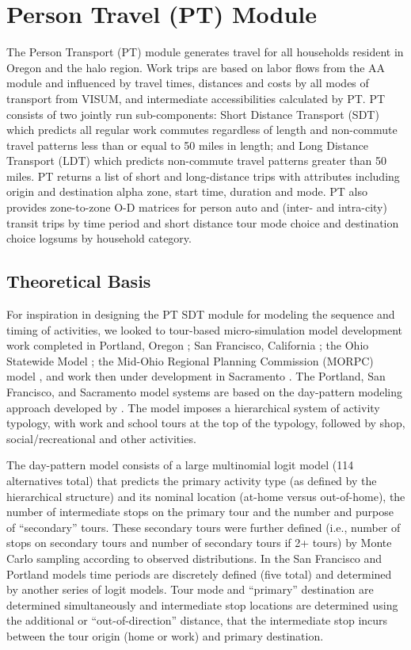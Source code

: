 \chapter{Person Travel (PT) Module}\label{sec:pt-module-chapter}
The Person Transport (PT) module generates travel for all households resident in Oregon and the halo region. Work trips are based on labor flows from the AA module and influenced by travel times, distances and costs by all modes of transport from VISUM, and intermediate accessibilities calculated by PT. PT consists of two jointly run sub-components: Short Distance Transport (SDT) which predicts all regular work commutes regardless of length and non-commute travel patterns less than or equal to 50 miles in length; and Long Distance Transport (LDT) which predicts non-commute travel patterns greater than 50 miles. PT returns a list of short and long-distance trips with attributes including origin and destination alpha zone, start time, duration and mode. PT also provides zone-to-zone O-D matrices for person auto and (inter- and intra-city) transit trips by time period and short distance tour mode choice and destination choice logsums by household category.

\section{Theoretical Basis}
For inspiration in designing the PT SDT module for modeling the sequence and timing of activities, we looked to tour-based micro-simulation model development work completed in Portland, Oregon \citep{cambridge99}; San Francisco, California \citep{jonnalagadda02}; the Ohio Statewide Model \citep{parsons10}; the Mid-Ohio Regional Planning Commission (MORPC) model \citep{vovsha04}, and work then under development in Sacramento \citep{bowman05}. The Portland, San Francisco, and Sacramento model systems are based on the day-pattern modeling approach developed by \cite{bowman95}. The model imposes a hierarchical system of activity typology, with work and school tours at the top of the typology, followed by shop, social/recreational and other activities.

The day-pattern model consists of a large multinomial logit model (114 alternatives total) that predicts the primary activity type (as defined by the hierarchical structure) and its nominal location (at-home versus out-of-home), the number of intermediate stops on the primary tour and the number and purpose of ``secondary'' tours. These secondary tours were further defined (i.e., number of stops on secondary tours and number of secondary tours if 2+ tours) by Monte Carlo sampling according to observed distributions. In the San Francisco and Portland models time periods are discretely defined (five total) and determined by another series of logit models. Tour mode and ``primary'' destination are determined simultaneously and intermediate stop locations are determined using the additional or ``out-of-direction'' distance, that the intermediate stop incurs between the tour origin (home or work) and primary destination. 

